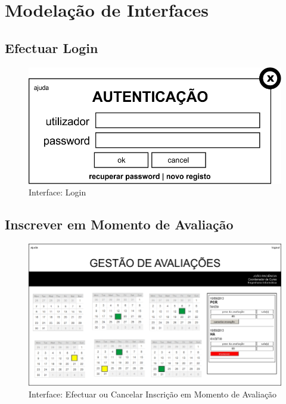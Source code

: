 \chapter{Modelação de Interfaces}

\section{Efectuar Login}
\begin{figure}[!htbp]
\centering
\includegraphics{imagens/login_i.jpg}
\caption{Interface: Login}
\label{fig:login_i}
\end{figure}


\clearpage
\section{Inscrever em Momento de Avaliação}

\begin{figure}[!htbp]
\centering
\includegraphics{imagens/inscrever_cancelar_inscricao_i.jpg}
\caption{Interface: Efectuar ou Cancelar Inscrição em Momento de Avaliação}
\label{fig:inscricao_avaliacao_i}
\end{figure}


\clearpage
